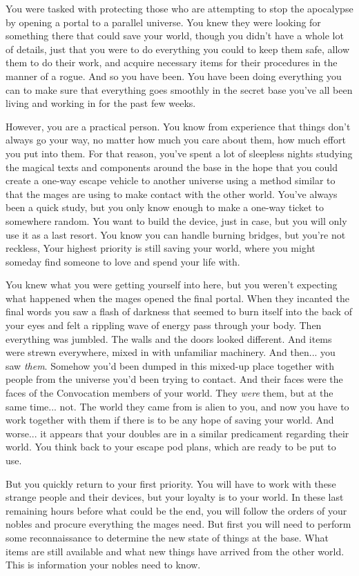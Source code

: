 \documentclass[char]{guildcamp3}
\begin{document}
You were tasked with protecting those who are attempting to stop the apocalypse by opening a portal to a parallel universe. You knew they were looking for something there that could save your world, though you didn't have a whole lot of details, just that you were to do everything you could to keep them safe, allow them to do their work, and acquire necessary items for their procedures in the manner of a rogue. And so you have been. You have been doing everything you can to make sure that everything goes smoothly in the secret base you've all been living and working in for the past few weeks.

However, you are a practical person. You know from experience that things don't always go your way, no matter how much you care about them, how much effort you put into them. For that reason, you've spent a lot of sleepless nights studying the magical texts and components around the base in the hope that you could create a one-way escape vehicle to another universe using a method similar to that the mages are using to make contact with the other world. You've always been a quick study, but you only know enough to make a one-way ticket to somewhere random. You want to build the device, just in case, but you will only use it as a last resort. You know you can handle burning bridges, but you're not reckless, Your highest priority is still saving your world, where you might someday find someone to love and spend your life with.

You knew what you were getting yourself into here, but you weren't expecting what happened when the mages opened the final portal. When they incanted the final words you saw a flash of darkness that seemed to burn itself into the back of your eyes and felt a rippling wave of energy pass through your body. Then everything was jumbled. The walls and the doors looked different. And items were strewn everywhere, mixed in with unfamiliar machinery. And then... you saw \emph{them}. Somehow you'd been dumped in this mixed-up place together with people from the universe you'd been trying to contact. And their faces were the faces of the Convocation members of your world. They \emph{were} them, but at the same time... not. The world they came from is alien to you, and now you have to work together with them if there is to be any hope of saving your world. And worse... it appears that your doubles are in a similar predicament regarding their world. You think back to your escape pod plans, which are ready to be put to use.

But you quickly return to your first priority. You will have to work with these strange people and their devices, but your loyalty is to your world. In these last remaining hours before what could be the end, you will follow the orders of your nobles and procure everything the mages need. But first you will need to perform some reconnaissance to determine the new state of things at the base. What items are still available and what new things have arrived from the other world. This is information your nobles need to know.
\end{document}
